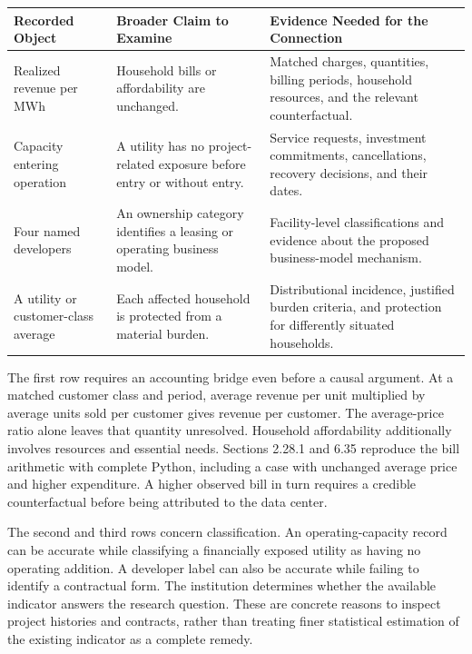 \begin{table}[H]
\centering\small
\begin{tabular}{@{}
  >{\raggedright\arraybackslash}p{}
  >{\raggedright\arraybackslash}p{}
  >{\raggedright\arraybackslash}p{}@{}}
\toprule
Recorded Object & Broader Claim to Examine & Evidence Needed for the
Connection \\
\midrule

Realized revenue per MWh & Household bills or affordability are
unchanged. & Matched charges, quantities, billing periods, household
resources, and the relevant counterfactual. \\
Capacity entering operation & A utility has no project-related exposure
before entry or without entry. & Service requests, investment
commitments, cancellations, recovery decisions, and their dates. \\
Four named developers & An ownership category identifies a leasing or
operating business model. & Facility-level classifications and evidence
about the proposed business-model mechanism. \\
A utility or customer-class average & Each affected household is
protected from a material burden. & Distributional incidence, justified
burden criteria, and protection for differently situated households. \\
\bottomrule
\end{tabular}
\end{table}

The first row requires an accounting bridge even before a causal
argument. At a matched customer class and period, average revenue per
unit multiplied by average units sold per customer gives revenue per
customer. The average-price ratio alone leaves that quantity unresolved.
Household affordability additionally involves resources and essential
needs. Sections 2.28.1 and 6.35 reproduce the bill arithmetic with
complete Python, including a case with unchanged average price and
higher expenditure. A higher observed bill in turn requires a credible
counterfactual before being attributed to the data center.

The second and third rows concern classification. An operating-capacity
record can be accurate while classifying a financially exposed utility
as having no operating addition. A developer label can also be accurate
while failing to identify a contractual form. The institution determines
whether the available indicator answers the research question. These are
concrete reasons to inspect project histories and contracts, rather than
treating finer statistical estimation of the existing indicator as a
complete remedy.

